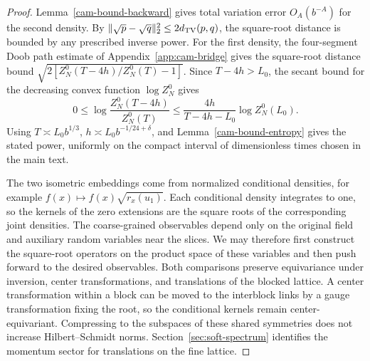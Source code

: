 \documentclass[11pt,a4paper]{article}
\numberwithin{equation}{section}
\begin{document}
\begin{proof}
Lemma~\ref{cam-bound-backward} gives total variation error \(O_A(b^{-A})\) for the second density. By \(\|\sqrt p-\sqrt q\|_2^2\le 2d_{\rm TV}(p,q)\), the square-root distance is bounded by any prescribed inverse power. For the first density, the four-segment Doob path estimate of Appendix~\ref{app:cam-bridge} gives the square-root distance bound \(\sqrt{2[Z_N^0(T-4h)/Z_N^0(T)-1]}\). Since \(T-4h>L_0\), the secant bound for the decreasing convex function \(\log Z_N^0\) gives
\[
 0\le \log\frac{Z_N^0(T-4h)}{Z_N^0(T)}
 \le \frac{4h}{T-4h-L_0}\log Z_N^0(L_0).
\]
Using \(T\asymp L_0b^{1/3}\), \(h\asymp L_0b^{-1/24+\delta}\), and Lemma~\ref{cam-bound-entropy} gives the stated power, uniformly on the compact interval of dimensionless times chosen in the main text.

The two isometric embeddings come from normalized conditional densities, for example \(f(x)\mapsto f(x)\sqrt{r_x(u_1)}\). Each conditional density integrates to one, so the kernels of the zero extensions are the square roots of the corresponding joint densities. The coarse-grained observables depend only on the original field and auxiliary random variables near the slices. We may therefore first construct the square-root operators on the product space of these variables and then push forward to the desired observables. Both comparisons preserve equivariance under inversion, center transformations, and translations of the blocked lattice. A center transformation within a block can be moved to the interblock links by a gauge transformation fixing the root, so the conditional kernels remain center-equivariant. Compressing to the subspaces of these shared symmetries does not increase Hilbert--Schmidt norms. Section~\ref{sec:soft-spectrum} identifies the momentum sector for translations on the fine lattice.
\end{proof}
\end{document}
